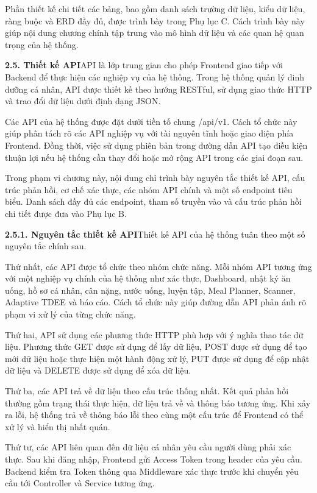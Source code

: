 Phần thiết kế chi tiết các bảng, bao gồm danh sách trường dữ liệu, kiểu dữ liệu, ràng buộc và ERD đầy đủ, được trình bày trong Phụ lục C. Cách trình bày này giúp nội dung chương chính tập trung vào mô hình dữ liệu và các quan hệ quan trọng của hệ thống.

\textbf{2.5. Thiết kế API}API là lớp trung gian cho phép Frontend giao tiếp với Backend để thực hiện các nghiệp vụ của hệ thống. Trong hệ thống quản lý dinh dưỡng cá nhân, API được thiết kế theo hướng RESTful, sử dụng giao thức HTTP và trao đổi dữ liệu dưới định dạng JSON.

Các API của hệ thống được đặt dưới tiền tố chung /api/v1. Cách tổ chức này giúp phân tách rõ các API nghiệp vụ với tài nguyên tĩnh hoặc giao diện phía Frontend. Đồng thời, việc sử dụng phiên bản trong đường dẫn API tạo điều kiện thuận lợi nếu hệ thống cần thay đổi hoặc mở rộng API trong các giai đoạn sau.

Trong phạm vi chương này, nội dung chỉ trình bày nguyên tắc thiết kế API, cấu trúc phản hồi, cơ chế xác thực, các nhóm API chính và một số endpoint tiêu biểu. Danh sách đầy đủ các endpoint, tham số truyền vào và cấu trúc phản hồi chi tiết được đưa vào Phụ lục B.

\textbf{2.5.1. Nguyên tắc thiết kế API}Thiết kế API của hệ thống tuân theo một số nguyên tắc chính sau.

Thứ nhất, các API được tổ chức theo nhóm chức năng. Mỗi nhóm API tương ứng với một nghiệp vụ chính của hệ thống như xác thực, Dashboard, nhật ký ăn uống, hồ sơ cá nhân, cân nặng, nước uống, luyện tập, Meal Planner, Scanner, Adaptive TDEE và báo cáo. Cách tổ chức này giúp đường dẫn API phản ánh rõ phạm vi xử lý của từng chức năng.

Thứ hai, API sử dụng các phương thức HTTP phù hợp với ý nghĩa thao tác dữ liệu. Phương thức GET được sử dụng để lấy dữ liệu, POST được sử dụng để tạo mới dữ liệu hoặc thực hiện một hành động xử lý, PUT được sử dụng để cập nhật dữ liệu và DELETE được sử dụng để xóa dữ liệu.

Thứ ba, các API trả về dữ liệu theo cấu trúc thống nhất. Kết quả phản hồi thường gồm trạng thái thực hiện, dữ liệu trả về và thông báo tương ứng. Khi xảy ra lỗi, hệ thống trả về thông báo lỗi theo cùng một cấu trúc để Frontend có thể xử lý và hiển thị nhất quán.

Thứ tư, các API liên quan đến dữ liệu cá nhân yêu cầu người dùng phải xác thực. Sau khi đăng nhập, Frontend gửi Access Token trong header của yêu cầu. Backend kiểm tra Token thông qua Middleware xác thực trước khi chuyển yêu cầu tới Controller và Service tương ứng.

